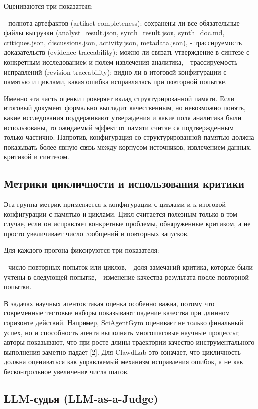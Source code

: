 Оцениваются три показателя:

- полнота артефактов (artifact completeness): сохранены ли все обязательные файлы выгрузки (analyst_result.json, synth_result.json, synth_doc.md, critiques.json, discussions.json, activity.json, metadata.json),
- трассируемость доказательств (evidence traceability): можно ли связать утверждение в синтезе с конкретным исследованием и полем извлечения аналитика,
- трассируемость исправлений (revision traceability): видно ли в итоговой конфигурации с памятью и циклами, какая ошибка исправлялась при повторной попытке.

Именно эта часть оценки проверяет вклад структурированной памяти. Если итоговый документ формально выглядит качественным, но невозможно понять, какие исследования поддерживают утверждения и какие поля аналитика были использованы, то ожидаемый эффект от памяти считается подтвержденным только частично. Напротив, конфигурация со структурированной памятью должна показывать более явную связь между корпусом источников, извлечением данных, критикой и синтезом.

\subsection{Метрики цикличности и использования критики}

Эта группа метрик применяется к конфигурации с циклами и к итоговой конфигурации с памятью и циклами. Цикл считается полезным только в том случае, если он исправляет конкретные проблемы, обнаруженные критиком, а не просто увеличивает число сообщений и повторных запусков.

Для каждого прогона фиксируются три показателя:

- число повторных попыток или циклов,
- доля замечаний критика, которые были учтены в следующей попытке,
- изменение качества результата после повторной попытки.

В задачах научных агентов такая оценка особенно важна, потому что современные тестовые наборы показывают падение качества при длинном горизонте действий. Например, SciAgentGym оценивает не только финальный успех, но и способность агента выполнять многошаговые научные процессы; авторы показывают, что при росте длины траектории качество инструментального выполнения заметно падает [2]. Для ClawdLab это означает, что цикличность должна оцениваться как управляемый механизм исправления ошибок, а не как бесконтрольное увеличение числа шагов.

\subsection{LLM-судья (LLM-as-a-Judge)}

